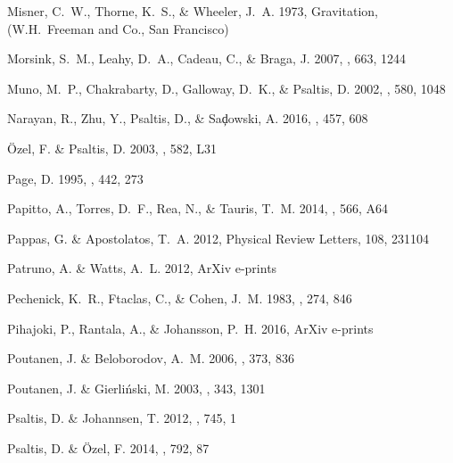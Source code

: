 \documentclass{aa}
\begin{document}
\begin{thebibliography}{55}
{Misner}, C.~W., {Thorne}, K.~S., \& {Wheeler}, J.~A. 1973, Gravitation, (W.H.~Freeman and Co., San Francisco)

{Morsink}, S.~M., {Leahy}, D.~A., {Cadeau}, C., \& {Braga}, J. 2007, \apj, 663,
  1244

{Muno}, M.~P., {Chakrabarty}, D., {Galloway}, D.~K., \& {Psaltis}, D. 2002,
  \apj, 580, 1048

{Narayan}, R., {Zhu}, Y., {Psaltis}, D., \& {Sa{\c d}owski}, A. 2016, \mnras,
  457, 608

{{\"O}zel}, F. \& {Psaltis}, D. 2003, \apjl, 582, L31

{Page}, D. 1995, \apj, 442, 273

{Papitto}, A., {Torres}, D.~F., {Rea}, N., \& {Tauris}, T.~M. 2014, \aap, 566,
  A64

{Pappas}, G. \& {Apostolatos}, T.~A. 2012, Physical Review Letters, 108, 231104

{Patruno}, A. \& {Watts}, A.~L. 2012, ArXiv e-prints \eprint{[arXiv:1206.2727]}

{Pechenick}, K.~R., {Ftaclas}, C., \& {Cohen}, J.~M. 1983, \apj, 274, 846

{Pihajoki}, P., {Rantala}, A., \& {Johansson}, P.~H. 2016, ArXiv e-prints \eprint{[arXiv:1612.02828]}

{Poutanen}, J. \& {Beloborodov}, A.~M. 2006, \mnras, 373, 836

{Poutanen}, J. \& {Gierli{\'n}ski}, M. 2003, \mnras, 343, 1301

{Psaltis}, D. \& {Johannsen}, T. 2012, \apj, 745, 1

{Psaltis}, D. \& {{\"O}zel}, F. 2014, \apj, 792, 87


\end{thebibliography}
\end{document}
